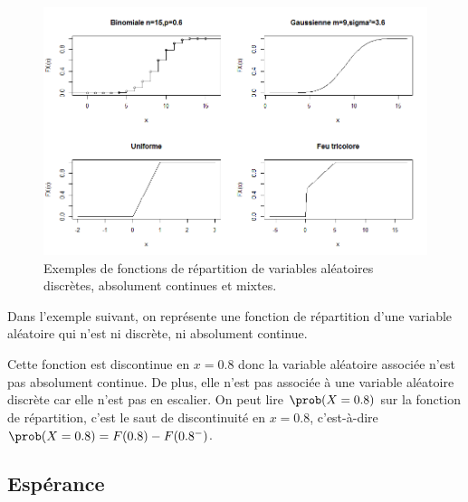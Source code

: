 \begin{figure}[h!]
	\centering
	\includegraphics[width=0.9\linewidth]{FonctionRepartition}
	\caption{Exemples de fonctions de répartition de variables aléatoires discrètes, absolument continues et mixtes.}
	\label{fig:fonctionrepartition}
\end{figure}

Dans l'exemple suivant, on représente une fonction de répartition d'une variable aléatoire qui n'est ni discrète, ni absolument continue. 

\begin{center}
\end{center}

Cette fonction est discontinue en $x=0.8$ donc la variable aléatoire associée n'est pas absolument continue. De plus, elle n'est pas associée à une variable aléatoire discrète car elle n'est pas en escalier. On peut lire $\prob(X=0.8)$ sur la fonction de répartition, c'est le saut de discontinuité en $x=0.8$, c'est-à-dire $\prob(X=0.8)= F(0.8) - F(0.8^-)$. 

\subsection{Espérance}

